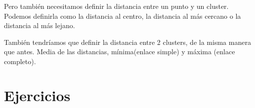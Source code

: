 \documentclass{apuntes}
\begin{document}
Pero también necesitamos definir la distancia entre un punto y un cluster. Podemos definirla como la distancia al centro, la distancia al más cercano o la distancia al más lejano.

También tendríamos que definir la distancia entre 2 clusters, de la misma manera que antes. Media de las distancias, mínima(enlace simple) y máxima (enlace completo).

\appendix


\chapter{Ejercicios}

\printindex
\end{document}
